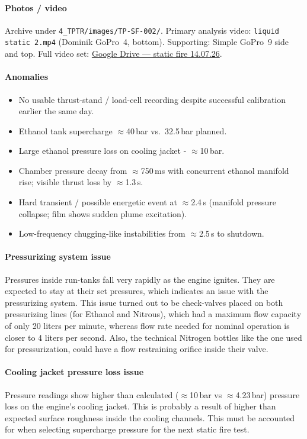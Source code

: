 \paragraph{Photos / video}
Archive under \texttt{4\_TPTR/images/TP-SF-002/}. Primary analysis video:
\texttt{liquid static 2.mp4} (Dominik GoPro~4, bottom). Supporting: Simple GoPro~9
side and top. Full video set:
\href{https://drive.google.com/drive/folders/1d65TkSBx83SWk-aAPDYAglD0gByUyFhu}{Google Drive --- static fire 14.07.26}.

\paragraph{Anomalies}
\begin{itemize}
  \item No usable thrust-stand / load-cell recording despite successful calibration
    earlier the same day.
  \item Ethanol tank supercharge $\approx$40\,bar vs.\ 32.5\,bar planned.
  \item Large ethanol pressure loss on cooling jacket - $\approx$10\,bar.
  \item Chamber pressure decay from $\approx$750\,ms with concurrent ethanol manifold
    rise; visible thrust loss by $\approx$1.3\,s.
  \item Hard transient / possible energetic event at $\approx$2.4\,s (manifold pressure
    collapse; film shows sudden plume excitation).
  \item Low-frequency chugging-like instabilities from $\approx$2.5\,s to shutdown.
\end{itemize}

\paragraph{Pressurizing system issue}
Pressures inside run-tanks fall very rapidly as the engine ignites. 
They are expected to stay at their set pressures, which indicates an issue with the pressurizing system.
This issue turned out to be check-valves placed on both pressurizing lines (for Ethanol and Nitrous), which had 
a maximum flow capacity of only 20 liters per minute, whereas flow rate needed for nominal operation is closer to 
4 liters per second. Also, the technical Nitrogen bottles like the one used for pressurization, could have a 
flow restraining orifice inside their valve.
\paragraph{Cooling jacket pressure loss issue} 
Pressure readings show higher than calculated ($\approx$10\,bar vs $\approx$4.23\,bar) pressure loss on the engine's cooling jacket.
This is probably a result of higher than expected surface roughness inside the cooling channels. 
This must be accounted for when selecting supercharge pressure for the next static fire test.
